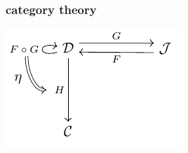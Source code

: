 \begin{frame}
\end{frame}

\begin{frame}
\frametitle{category theory}
	\begin{center}	
			\includegraphics{fig/comdiagtest.pdf}
	\end{center}		
\end{frame}


